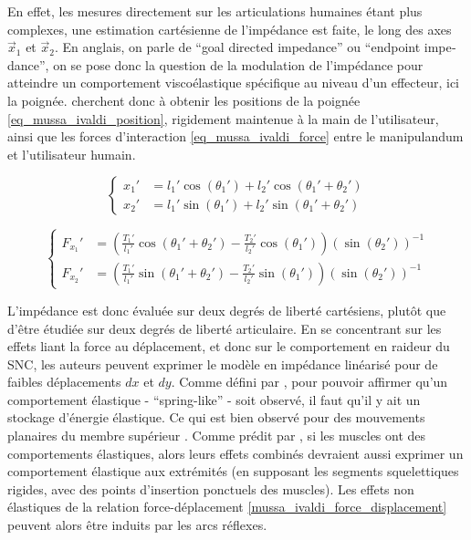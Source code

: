 
\tikzexternaldisable

En effet, les mesures directement sur les articulations humaines étant plus complexes, une estimation cartésienne de l'impédance est faite, le long des axes $\vec{x}_1$ et $\vec{x}_2$. En anglais, on parle de \foreignquote{french}{goal directed impedance} ou \foreignquote{french}{endpoint impedance}, on se pose donc la question de la modulation de l'impédance pour atteindre un comportement viscoélastique spécifique au niveau d'un effecteur, ici la poignée. \parencite{mussa-ivaldi_neural_1985} cherchent donc à obtenir les positions de la poignée \cref{eq_mussa_ivaldi_position}, rigidement maintenue à la main de l'utilisateur, ainsi que les forces d'interaction \cref{eq_mussa_ivaldi_force} entre le manipulandum et l'utilisateur humain.

\begin{equation} \label{eq_mussa_ivaldi_position}
	\begin{cases}
		x_1' &= l_1'\cos(\theta_1') + l_2'\cos(\theta_1' + \theta_2') \\
		x_2' &= l_1'\sin(\theta_1') + l_2'\sin(\theta_1' + \theta_2')
	\end{cases}
\end{equation}

\begin{equation} \label{eq_mussa_ivaldi_force}
	\begin{cases}
		F_{x_1}' &= \left( \frac{T_1'}{l_1'}\cos(\theta_1' + \theta_2') - \frac{T_2'}{l_2'}\cos(\theta_1') \right) (\sin(\theta_2'))^{-1} \\
		F_{x_2}' &= \left( \frac{T_1'}{l_1'}\sin(\theta_1' + \theta_2') - \frac{T_2'}{l_2'}\sin(\theta_1') \right) (\sin(\theta_2'))^{-1}  
	\end{cases}
\end{equation}

L'impédance est donc évaluée sur deux degrés de liberté cartésiens, plutôt que d'être étudiée sur deux degrés de liberté articulaire. En se concentrant sur les effets liant la force au déplacement, et donc sur le comportement en raideur du SNC, les auteurs peuvent exprimer le modèle en impédance linéarisé pour de faibles déplacements $dx$ et $dy$. Comme défini par \parencite{hogan_mechanics_1985}, pour pouvoir affirmer qu'un comportement élastique - \foreignquote{french}{spring-like} - soit observé, il faut qu'il y ait un stockage d'énergie élastique. Ce qui est bien observé pour des mouvements planaires du membre supérieur \parencite{mussa-ivaldi_neural_1985}. Comme prédit par \textcite{hogan_mechanics_1985}, si les muscles ont des comportements élastiques, alors leurs effets combinés devraient aussi exprimer un comportement élastique aux extrémités (en supposant les segments squelettiques rigides, avec des points d'insertion ponctuels des muscles). Les effets non élastiques de la relation force-déplacement \cref{mussa_ivaldi_force_displacement} peuvent alors être induits par les arcs réflexes.

